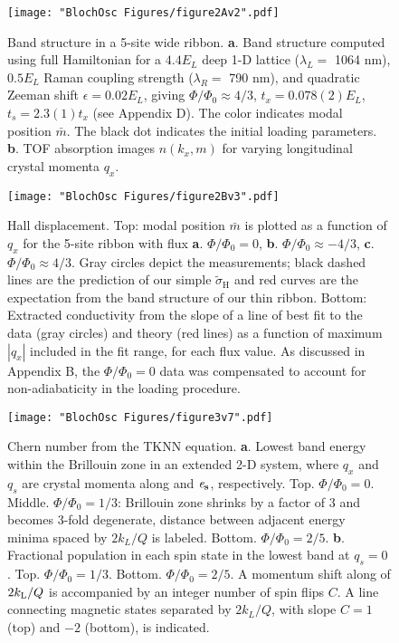 \begin{figure}
\texttt{[image: "BlochOsc Figures/figure2Av2".pdf]}
\caption{Band structure in a 5-site wide ribbon.  \textbf{a}. Band structure computed using full Hamiltonian for a $4.4 E_L$ deep 1-D lattice ($\lambda_L=$ 1064 nm), $0.5 E_L$ Raman coupling strength ($\lambda_R = $ 790 nm), and quadratic Zeeman shift $\epsilon=0.02 E_L$, giving $\Phi/\Phi_0 \approx 4/3$, $t_x = 0.078(2) E_L$, $t_s=2.3(1) t_x$ (see Appendix D). The color indicates modal position $\bar{m}$. The black dot indicates the initial loading parameters.  \textbf{b}. TOF absorption images $n(k_x,m)$ for varying longitudinal crystal momenta $q_x$.  }
\label{fig:bandStructure}
\end{figure}

\begin{figure}
\texttt{[image: "BlochOsc Figures/figure2Bv3".pdf]}
\caption{Hall displacement. Top: modal position $\bar{m}$ is plotted as a function of $q_x$ for the 5-site ribbon with flux \textbf{a}. $\Phi/\Phi_0=0$, \textbf{b}. $\Phi/\Phi_0\approx-4/3$, \textbf{c}. $\Phi/\Phi_0\approx4/3$. Gray circles depict the measurements; black dashed lines are the prediction of our simple $\tilde{\sigma}_\textrm{H}$ and red curves are the expectation from the band structure of our thin ribbon. Bottom: Extracted conductivity from the slope of a line of best fit to the data (gray circles) and theory (red lines) as a function of maximum $|q_x|$ included in the fit range, for each flux value. As discussed in Appendix B, the $\Phi/\Phi_0=0$ data was compensated to account for non-adiabaticity in the loading procedure. }
\label{fig:magnetization}
\end{figure}

\begin{figure}
\texttt{[image: "BlochOsc Figures/figure3v7".pdf]}
\caption{Chern number from the TKNN equation.  \textbf{a}. Lowest band energy within the Brillouin zone in an extended 2-D system, where $q_x$ and $q_s$ are crystal momenta along \ex and $\bf{\mathit{e}_s}$, respectively. Top. $\Phi/\Phi_0=0$. Middle. $\Phi/\Phi_0=1/3$: Brillouin zone shrinks by a factor of $3$ and becomes 3-fold degenerate, distance between adjacent energy minima spaced by $2k_L/Q$ is labeled. Bottom. $\Phi/\Phi_0=2/5$. \textbf{b}.  Fractional population in each spin state in the lowest band at $q_s=0$. Top. $\Phi/\Phi_0=1/3$. Bottom. $\Phi/\Phi_0=2/5$. A momentum shift along \ex of $2k_{\rm{L}}/Q$ is accompanied by an integer number of spin flips $C$. A line connecting magnetic states separated by $2k_L/Q$, with slope $C=1$ (top) and $-2$ (bottom), is indicated. }
\label{fig:Diophantine}
\end{figure}
	
